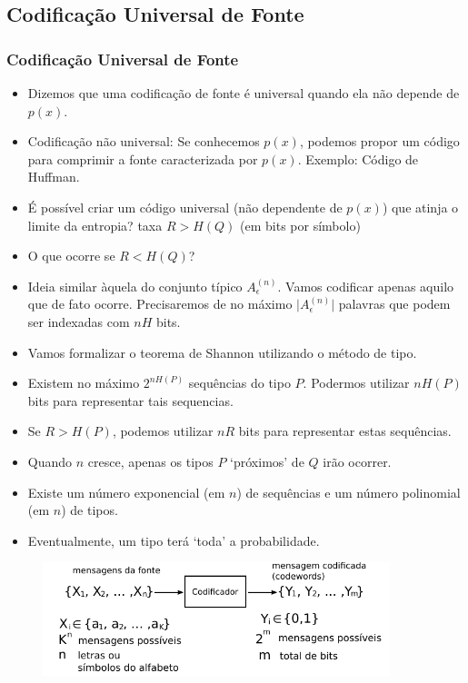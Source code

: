 \subsection{Codificação Universal de Fonte}
\begin{frame}[allowframebreaks]
  \frametitle{Codificação Universal de Fonte}
  \begin{itemize}
  \item Dizemos que uma codificação de fonte é universal quando ela não depende de $p(x)$.
  \item Codificação não universal: Se conhecemos $p(x)$, podemos propor um código para comprimir a fonte caracterizada por $p(x)$.
	Exemplo: Código de Huffman.
  \item É possível criar um código universal (não dependente de $p(x)$) que atinja o limite da entropia? taxa $R > H(Q)$ (em bits por símbolo)
  \item O que ocorre se $R < H(Q)$?
  \item Ideia similar àquela do conjunto típico $A_{\epsilon}^{(n)}$. Vamos codificar apenas aquilo que de fato ocorre.
	Precisaremos de no máximo $\vert A_{\epsilon}^{(n)} \vert$ palavras que podem ser indexadas com $nH$ bits.
  \item Vamos formalizar o teorema de Shannon utilizando o método de tipo.
  \end{itemize}

  \framebreak

  \begin{itemize}
  \item Existem no máximo $2^{nH(P)}$ sequências do tipo $P$. Podermos utilizar $nH(P)$ bits para representar tais sequencias.
  \item Se $R > H(P)$, podemos utilizar $nR$ bits para representar estas sequências.
  \item Quando $n$ cresce, apenas os tipos $P$ `próximos' de $Q$ irão ocorrer.
  \item Existe um número exponencial (em $n$) de sequências e um número polinomial (em $n$) de tipos.
  \item Eventualmente, um tipo terá `toda' a probabilidade.
  \end{itemize}

  \framebreak
 
  \begin{figure}[h!]
  \centering
  \includegraphics[width=0.9\textwidth]{images/blockcoding.pdf}
  \label{fig:blockcoding-types}
  \end{figure}

\end{frame}


